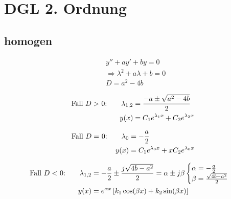 \section{DGL 2. Ordnung}
\subsection{homogen}

\begin{align*}
&y'' + ay' +by = 0\\
&\Rightarrow \lambda^2 +a\lambda+b=0 \\
&D =  a^2-4b
\end{align*}


\begin{align*}
\text{Fall $D>$ 0:\qquad}\lambda_{1,2} &= \frac{-a\pm\sqrt{a^2-4b}}{2}\\
y(x) &= C_{1}e^{\lambda_{1}x}+C_{2}e^{\lambda_{2}x}
\end{align*}

\begin{align*}
\text{Fall $D=$ 0:\qquad}\lambda_{0} &= -\frac{a}{2}\\
y(x) &= C_{1}e^{\lambda_{0}x}+xC_{2}e^{\lambda_{0}x}
\end{align*}

\begin{align*}
\text{Fall $D<$ 0:\qquad}\lambda_{1,2} &= -\frac{a}{2}\pm \frac{j\sqrt{4b-a^2}}{2}
=\alpha\pm j\beta
\begin{cases}
\alpha = -\frac{a}{2}\\
\beta = \frac{\sqrt{4b-a^2}}{2}
\end{cases}\\
y(x) &= e^{\alpha x}\left[k_{1}\cos(\beta x)+k_{2}\sin(\beta x)\right]
\end{align*}


